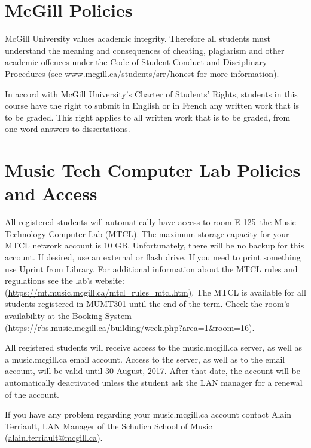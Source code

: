 \documentclass[11pt]{amsart}
\begin{document}
\section{McGill Policies}

McGill University values academic integrity. Therefore all students must understand the meaning and consequences of cheating, plagiarism and other academic offences under the Code of Student Conduct and Disciplinary Procedures (see \href{http://www.mcgill.ca/students/srr/honest}{www.mcgill.ca/students/srr/honest} for more information).

In accord with McGill University’s Charter of Students’ Rights, students in this course have the right to submit in English or in French any written work that is to be graded. This right applies to all written work that is to be graded, from one-word answers to dissertations.


\section{Music Tech Computer Lab Policies and Access}
All registered students will automatically have access to room E-125--the Music Technology Computer Lab (MTCL).
The maximum storage capacity for your MTCL network account is 10 GB.\@
Unfortunately, there will be no backup for this account. If desired, use an external or flash drive. If you need to print something use Uprint from Library. For additional information about the MTCL rules and regulations see the lab's website: \href{https://mt.music.mcgill.ca/mtcl_rules_mtcl.htm}{(https://mt.music.mcgill.ca/mtcl\_rules\_mtcl.htm)}. The MTCL is available for all students registered in MUMT301 until the end of the term. Check the room's availability at the Booking System \href{(https://rbs.music.mcgill.ca/building/week.php?area=1&room=16)}{(https://rbs.music.mcgill.ca/building/week.php?area=1&room=16)}.

All registered students will receive access to the music.mcgill.ca server, as well as a music.mcgill.ca email account. Access to the server, as well as to the email account, will be valid until 30 August, 2017. After that date, the account will be automatically deactivated unless the student ask the LAN manager for a renewal of the account.

If you have any problem regarding your music.mcgill.ca account contact Alain Terriault, LAN Manager of the Schulich School of Music (\href{mailto:alain.terriault@mcgill.ca}{alain.terriault@mcgill.ca}). 
\end{document}

